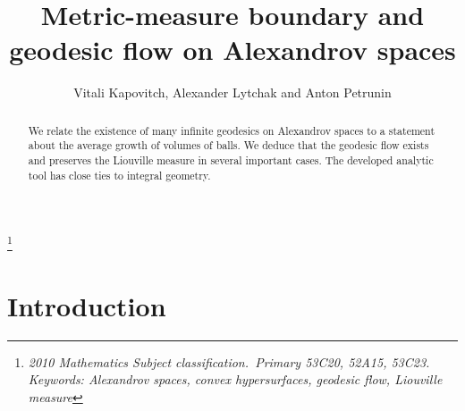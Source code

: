\documentclass[12pt,leqno]{amsart}
\numberwithin{equation}{section}
\theoremstyle{definition}
\theoremstyle{remark}
\begin{document}
\pagebreak
%


\title{Metric-measure boundary and geodesic flow  on Alexandrov spaces}
\thanks{\it 2010 Mathematics Subject classification.\rm\ Primary
53C20, 52A15, 53C23. Keywords: Alexandrov spaces, convex hypersurfaces, geodesic flow, Liouville measure}\

\author{Vitali Kapovitch, Alexander Lytchak and Anton Petrunin}







\begin{abstract}
 We relate the existence of many infinite geodesics on Alexandrov spaces to a statement about the average growth of volumes of balls. We deduce that the geodesic flow exists and preserves the Liouville measure in several important cases. The developed analytic tool has close ties  to integral geometry.
\end{abstract}


\maketitle
\renewcommand{\theequation}{\arabic{section}.\arabic{equation}}


\section{Introduction}
\end{document}
